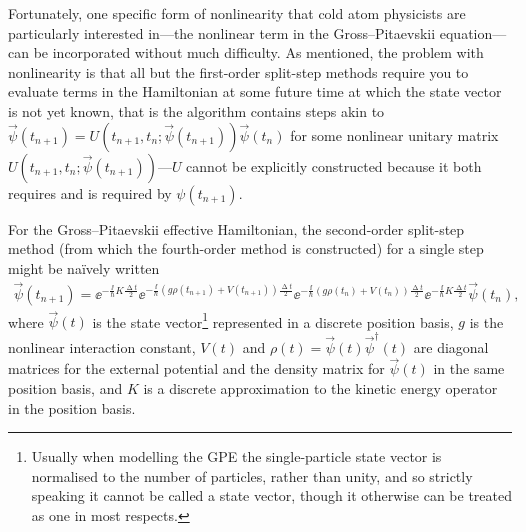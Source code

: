 Fortunately, one specific form of nonlinearity that cold atom physicists are particularly interested in---the nonlinear term in the Gross--Pitaevskii equation---can be incorporated without much difficulty. As mentioned, the problem with nonlinearity is that all but the first-order split-step methods require you to evaluate terms in the Hamiltonian at some future time at which the state vector is not yet known, that is the algorithm contains steps akin to $\vec \psi(t_{n+1}) = U(t_{n+1}, t_n; \vec\psi(t_{n+1})) \vec \psi(t_n)$ for some nonlinear unitary matrix $U(t_{n+1}, t_n; \vec\psi(t_{n+1}))$---$U$ cannot be explicitly constructed because it both requires and is required by $\psi(t_{n+1})$.

For the Gross--Pitaevskii effective Hamiltonian, the second-order split-step method (from which the fourth-order method is constructed) for a single step might be na\"ively written
\begin{align}
\vec \psi(t_{n+1}) =
\ee^{-\frac\ii\hbar K \frac{\upDelta t} 2}
\ee^{-\frac\ii\hbar (g\rho(t_{n+1}) + V(t_{n+1})) \frac{\upDelta t} 2}
\ee^{-\frac\ii\hbar (g\rho(t_n) + V(t_n) ) \frac{\upDelta t} 2}
\ee^{-\frac\ii\hbar K \frac{\upDelta t} 2}
\vec \psi(t_n),
\end{align}
where $\vec\psi(t)$ is the state vector\footnote{Usually when modelling the GPE the single-particle state vector is normalised to the number of particles, rather than unity, and so strictly speaking it cannot be called a state vector, though it otherwise can be treated as one in most respects.} represented in a discrete position basis, $g$ is the nonlinear interaction constant, $V(t)$ and $\rho(t) = \vec\psi(t)\vec\psi^\dagger(t)$ are diagonal matrices for the external potential and the density matrix for $\vec\psi(t)$ in the same position basis, and $K$ is a discrete approximation to the kinetic energy operator in the position basis.

